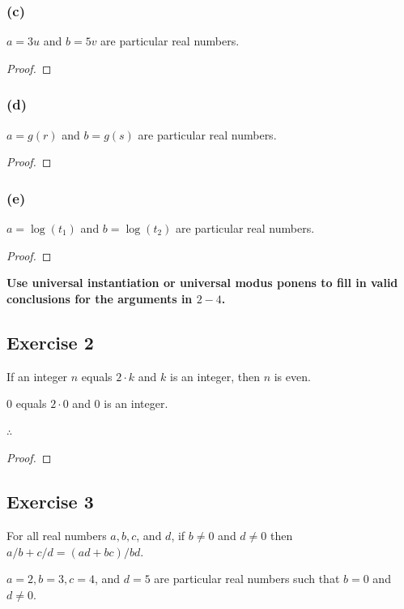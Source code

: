 \documentclass[14pt]{extarticle}
\newcommand{\fbl}{\underline{\hspace{1cm}}\,\,}
\begin{document}
\subsubsection{(c)}
$a = 3u$ and $b = 5v$ are particular real numbers.

\begin{proof}

\end{proof}

\subsubsection{(d)}
$a = g(r)$ and $b = g(s)$ are particular real numbers.

\begin{proof}

\end{proof}

\subsubsection{(e)}
$a = \log(t_1)$ and $b = \log(t_2)$ are particular real numbers.

\begin{proof}

\end{proof}

{\bf \color{cyan} Use universal instantiation or universal modus ponens to fill in valid conclusions for the arguments in $2-4$.}

\subsection{Exercise 2}
If an integer $n$ equals $2\cdot k$ and $k$ is an integer, then $n$ is even.

0 equals $2\cdot 0$ and 0 is an integer.

$\therefore$ \fbl

\begin{proof}

\end{proof}

\subsection{Exercise 3}
For all real numbers $a, b, c$, and $d$, if $b \neq 0$ and $d \neq 0$ then $a/b + c/d = (ad + bc)/bd$.

$a = 2, b = 3, c = 4$, and $d = 5$ are particular real numbers such that $b = 0$ and $d \neq 0$.
\end{document}
